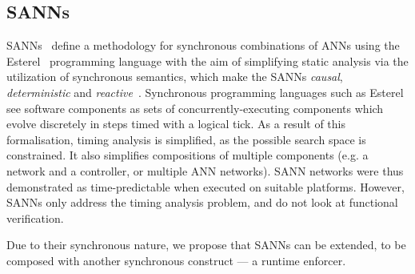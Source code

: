 

\subsection{\acfp{SANN}}

\acp{SANN}~\cite{sann} define a methodology for synchronous combinations of \acp{ANN} using the Esterel~\cite{berry2000foundations} programming language with the aim of simplifying static analysis via the utilization of synchronous semantics, which make the \acp{SANN} \textit{causal}, \textit{deterministic} and \textit{reactive}~\cite{benveniste2003synchronous}. 
Synchronous programming languages such as Esterel see software components as sets of concurrently-executing components which evolve discretely in steps timed with a logical tick.
As a result of this formalisation, timing analysis is simplified, as the possible search space is constrained.
It also simplifies compositions of multiple components (e.g. a network and a controller, or multiple \ac{ANN} networks).
\ac{SANN} networks were thus demonstrated as time-predictable when executed on suitable platforms.
However, \acp{SANN} only address the timing analysis problem, and do not look at functional verification.


Due to their synchronous nature, we propose that \acp{SANN} can be extended, to be composed with another synchronous construct --- a runtime enforcer.




